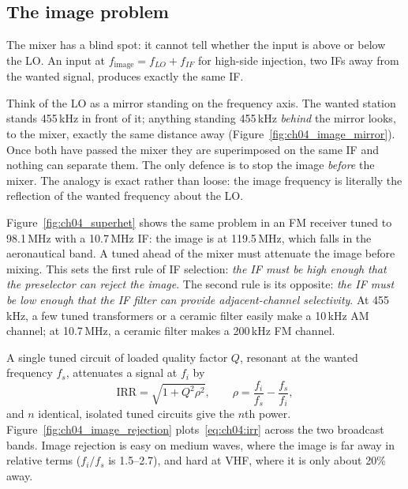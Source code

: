 \subsection{The image problem}
\label{sec:ch04:image}

The mixer has a blind spot: it cannot tell whether the input is above or below the LO. An input at
$f_{\text{image}}=f_{LO}+f_{IF}$ for high-side injection, two IFs away from the wanted signal, produces
exactly the same IF.

\begin{analogy}
Think of the LO as a mirror standing on the frequency axis. The wanted station stands 455\,kHz in front of
it; anything standing 455\,kHz \emph{behind} the mirror looks, to the mixer, exactly the same distance away
(Figure~\ref{fig:ch04_image_mirror}). Once both have passed the mixer they are superimposed on the same IF and
nothing can separate them. The only defence is to stop the image \emph{before} the mixer. The analogy is
exact rather than loose: the image frequency is literally the reflection of the wanted frequency about the
LO.
\end{analogy}


Figure~\ref{fig:ch04_superhet} shows the same problem in an FM receiver tuned to 98.1\,MHz with a 10.7\,MHz
IF: the image is at 119.5\,MHz, which falls in the aeronautical band. A tuned  ahead of the
mixer must attenuate the image before mixing. This sets the first rule of IF selection: \emph{the IF must be
high enough that the preselector can reject the image}. The second rule is its opposite: \emph{the IF must be
low enough that the IF filter can provide adjacent-channel selectivity}. At 455\,kHz, a few tuned transformers
or a ceramic filter easily make a 10\,kHz AM channel; at 10.7\,MHz, a ceramic filter makes a 200\,kHz FM
channel.


A single tuned circuit of loaded quality factor $Q$, resonant at the wanted frequency $f_s$, attenuates a
signal at $f_i$ by
\begin{equation}
\text{IRR}=\sqrt{1+Q^2\rho^2},\qquad \rho=\frac{f_i}{f_s}-\frac{f_s}{f_i},
\label{eq:ch04:irr}
\end{equation}
and $n$ identical, isolated tuned circuits give the $n$th power. Figure~\ref{fig:ch04_image_rejection}
plots~\eqref{eq:ch04:irr} across the two broadcast bands. Image rejection is easy on medium waves, where the
image is far away in relative terms ($f_i/f_s$ is 1.5--2.7), and hard at VHF, where it is only about 20\% away.

